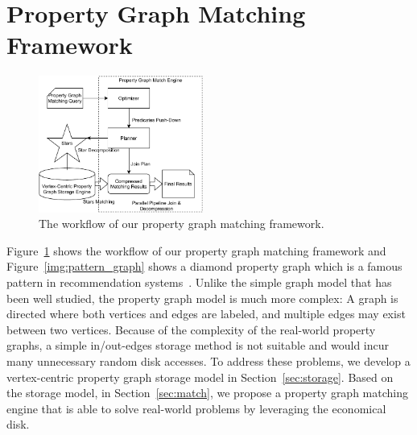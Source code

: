 \section{Property Graph Matching Framework}\label{sec:framework}
\begin{figure}[ht]
  \centering
  \includegraphics[width=0.48\textwidth]{img/architecture.pdf}
  \caption{The workflow of our property graph matching framework.}\label{img:architecture}
\end{figure}
Figure~\ref{img:architecture} shows the workflow of our property graph matching framework and Figure~\ref{img:pattern_graph} shows a diamond property graph which is a famous pattern in recommendation systems~\cite{DBLP:journals/pvldb/GuptaSGGZLL14}.
Unlike the simple graph model that has been well studied,
the property graph model is much more complex:
A graph is directed where both vertices and edges are labeled, and multiple edges may exist between two vertices.
Because of the complexity of the real-world property graphs,
a simple in/out-edges storage method is not suitable and would incur many unnecessary random disk accesses.
To address these problems, we develop a vertex-centric property graph storage model in Section~\ref{sec:storage}.
Based on the storage model, in Section~\ref{sec:match},
we propose a property graph matching engine that is able to solve real-world problems by leveraging the economical disk.

